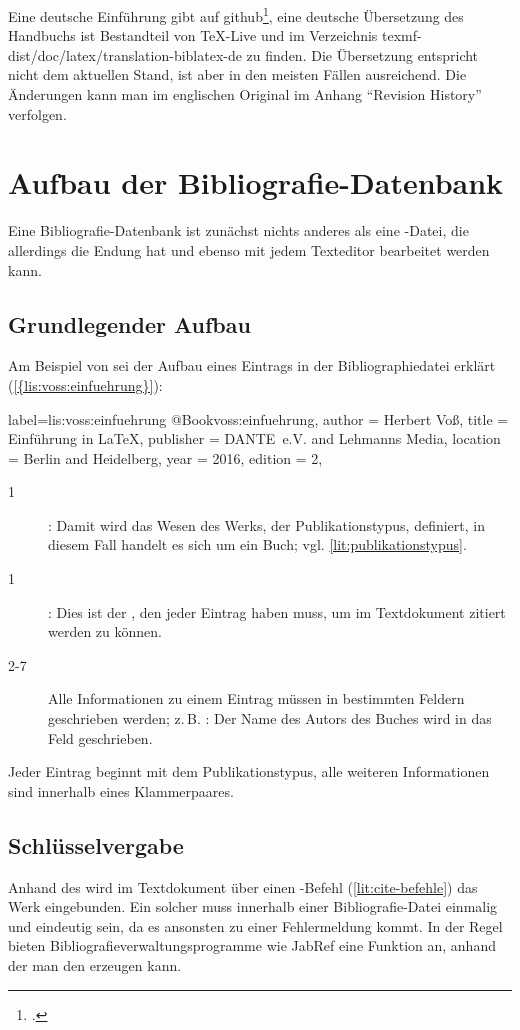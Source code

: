 Eine deutsche Einführung gibt auf github\footcite{biblatex-bottcher}, 
eine deutsche Übersetzung des Handbuchs ist Bestandteil von TeX-Live und im Verzeichnis 
texmf-dist/doc/latex/translation-biblatex-de zu finden.
Die Übersetzung entspricht nicht dem aktuellen Stand, ist aber in den meisten Fällen ausreichend.
Die Änderungen kann man im englischen Original im Anhang \enquote{Revision History} verfolgen.

\section{Aufbau der Bibliografie-Datenbank}\label{sec:bibliografiedatenbank}
Eine Bibliografie-Datenbank ist zunächst nichts anderes als eine -Datei,
die allerdings die Endung  hat und ebenso mit jedem Texteditor bearbeitet werden kann.

\subsection{Grundlegender Aufbau}
Am Beispiel von \cite{voss:einfuehrung} sei der Aufbau eines Eintrags in der Bibliographiedatei erklärt (\cref{{lis:voss:einfuehrung}}):

\begin{lfgwcode}{label={lis:voss:einfuehrung}}
@Book{voss:einfuehrung,
 author    = {Herbert Voß}, 
 title     = {Einführung in \LaTeX},
 publisher = {DANTE~e.V. and Lehmanns Media},
 location  = {Berlin and Heidelberg},
 year      = {2016},
 edition   = {2},
}
\end{lfgwcode}

\begin{description}
 \item[1] : Damit wird das Wesen des Werks, der Publikationstypus, definiert, in diesem Fall handelt es sich um ein Buch; vgl. \cref{lit:publikationstypus}.
 \item[1] : Dies ist der , den jeder Eintrag haben muss, um im Textdokument zitiert werden zu können.
 \item[2-7] Alle Informationen zu einem Eintrag müssen in bestimmten Feldern geschrieben werden; z.\,B. : 
 Der Name des Autors des Buches wird in das Feld  geschrieben. 
\end{description}
Jeder Eintrag beginnt mit dem Publikationstypus, alle weiteren Informationen sind innerhalb eines Klammerpaares.
\subsection{Schlüsselvergabe}
Anhand des  wird im Textdokument über einen -Befehl (\cref{lit:cite-befehle}) das Werk eingebunden.
Ein solcher  muss innerhalb einer Bibliografie-Datei einmalig und eindeutig sein, 
da es ansonsten zu einer Fehlermeldung kommt.
In der Regel bieten Bibliografieverwaltungsprogramme wie JabRef eine Funktion an, anhand der man den  erzeugen kann. 


